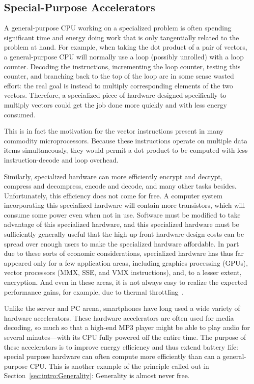\subsection{Special-Purpose Accelerators}
\label{sec:cpu:Special-Purpose Accelerators}

A general-purpose CPU working on a specialized problem is often spending
significant time and energy doing work that is only tangentially related
to the problem at hand.
For example, when taking the dot product of a pair of vectors, a
general-purpose CPU will normally use a loop (possibly unrolled)
with a loop counter.
Decoding the instructions, incrementing the loop counter, testing this
counter, and branching back to the
top of the loop are in some sense wasted effort: the real goal is
instead to multiply corresponding elements of the two vectors.
Therefore, a specialized piece of hardware designed specifically to
multiply vectors could get the job done more quickly and with less
energy consumed.

This is in fact the motivation for the vector instructions present in
many commodity microprocessors.
Because these instructions operate on multiple data items simultaneously,
they would permit a dot product to be computed with less instruction-decode
and loop overhead.

Similarly, specialized hardware can more efficiently encrypt and decrypt,
compress and decompress, encode and decode, and many other tasks besides.
Unfortunately, this efficiency does not come for free.
A computer system incorporating this specialized hardware will contain
more transistors, which will consume some power even when not in use.
Software must be modified to take advantage of this specialized hardware,
and this specialized hardware must be sufficiently generally useful
that the high up-front hardware-design costs can be spread over enough
users to make the specialized hardware affordable.
In part due to these sorts of economic considerations, specialized
hardware has thus far appeared only for a few application areas,
including graphics processing (GPUs), vector processors (MMX, SSE,
and VMX instructions), and, to a lesser extent, encryption.
And even in these areas, it is not always easy to realize the expected
performance gains, for example, due to thermal
throttling~\cite{VladKrasnov2017SIMDfreqscale,DanielLemire2018SIMDfreqscale,TravisDowns2020SIMDfreqscale}.

Unlike the server and PC arena, smartphones have long used a wide
variety of hardware accelerators.
These hardware accelerators are often used for media decoding,
so much so that a high-end MP3 player might be able to play audio
for several minutes---with its CPU fully powered off the entire time.
The purpose of these accelerators is to improve energy efficiency
and thus extend battery life: special purpose hardware can often
compute more efficiently than can a general-purpose CPU\@.
This is another example of the principle called out in
Section~\ref{sec:intro:Generality}: Generality is almost never free.

